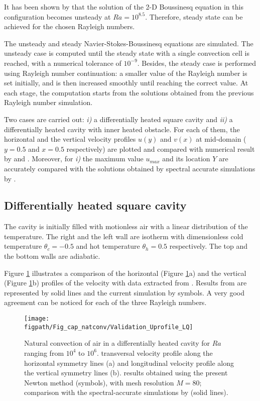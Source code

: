 It has been shown by \cite{LeQuere91} that the solution of the 2-D Boussinesq equation in this configuration becomes unsteady at $Ra = 10^{8.5}$.
Therefore, steady state can be achieved for the chosen Rayleigh numbers.

The unsteady and steady Navier-Stokes-Boussinesq equations are simulated.
The unsteady case is computed until the steady state with a single convection cell is reached, with a numerical tolerance of $10^{-9}$.
Besides, the steady case is performed using Rayleigh number continuation:
a smaller value of the Rayleigh number is set initially, and is then increased smoothly until reaching the correct value.
At each stage, the computation starts from the solutions obtained from the previous Rayleigh number simulation.

Two cases are carried out: {\it i)} a differentially heated square cavity and {\it ii)} a differentially heated cavity with inner heated obstacle.
For each of them, the horizontal and the vertical velocity profiles $u(y)$ and $v(x)$ at mid-domain ($y=0.5$ and $x=0.5$ respectively) are plotted and compared with numerical result by \cite{LeQuere91} and \cite{Raluca2013}. 
Moreover, for {\it i)} the maximum value $u_{max}$ and its location $Y$ are accurately compared with the solutions obtained by spectral accurate simulations by \cite{LeQuere91}.

\subsection{Differentially heated square cavity} \label{sub-diff-heated}
The cavity is initially filled with motionless air with a linear distribution of the temperature.
The right and the left wall are isotherm with dimensionless cold temperature $\theta_c = -0.5$ and hot temperature $\theta_h = 0.5$ respectively. The top and the bottom walls are adiabatic.

Figure \ref{fig-T1-prof} illustrates a comparison of the horizontal (Figure \ref{fig-T1-prof}a) and the vertical (Figure \ref{fig-T1-prof}b)  profiles of the velocity with data extracted from  \cite{LeQuere91}.
Results from \cite{LeQuere91} are represented by solid lines and the current simulation by symbols.
A very good agreement can  be noticed for each of the three Rayleigh numbers.

\begin{figure}
	\begin{center}
		\texttt{[image: \\figpath/Fig\_cap\_natconv/Validation\_Uprofile\_LQ]} 
	\end{center}
	\caption{Natural convection of air in a differentially heated cavity for $Ra$ ranging from $10^4$ to $10^6$. transversal velocity profile along the  horizontal symmetry lines (a) and longitudinal velocity profile along the vertical symmetry lines (b). results obtained using the present Newton method (symbols), with mesh resolution $M=80$; comparison with the spectral-accurate simulations by \cite{LeQuere91} (solid lines).}
	\label{fig-T1-prof}
\end{figure}

